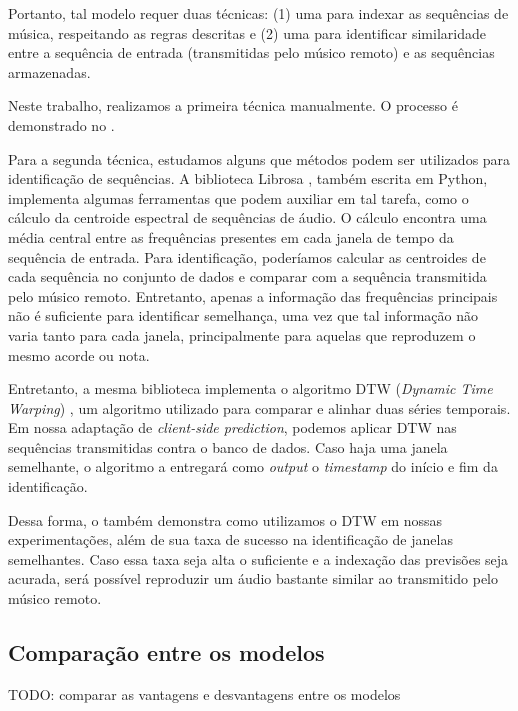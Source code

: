 Portanto, tal modelo requer duas técnicas: (1) uma para indexar as sequências de música, respeitando as regras descritas e (2) uma para identificar similaridade entre a sequência de entrada (transmitidas pelo músico remoto) e as sequências armazenadas.

Neste trabalho, realizamos a primeira técnica manualmente. O processo é demonstrado no .

Para a segunda técnica, estudamos alguns que métodos podem ser utilizados para identificação de sequências. A biblioteca Librosa \cite{librosa}, também escrita em Python, implementa algumas ferramentas que podem auxiliar em tal tarefa, como o cálculo da centroide espectral \cite{centroid} de sequências de áudio. O cálculo encontra uma média central entre as frequências presentes em cada janela de tempo da sequência de entrada. Para identificação, poderíamos calcular as centroides de cada sequência no conjunto de dados e comparar com a sequência transmitida pelo músico remoto. Entretanto, apenas a informação das frequências principais não é suficiente para identificar semelhança, uma vez que tal informação não varia tanto para cada janela, principalmente para aquelas que reproduzem o mesmo acorde ou nota.

Entretanto, a mesma biblioteca implementa o algoritmo DTW (\textit{Dynamic Time Warping}) \cite{dtw}, um algoritmo utilizado para comparar e alinhar duas séries temporais. Em nossa adaptação de \textit{client-side prediction}, podemos aplicar DTW nas sequências transmitidas contra o banco de dados. Caso haja uma janela semelhante, o algoritmo a entregará como \textit{output} o \textit{timestamp} do início e fim da identificação.

Dessa forma, o  também demonstra como utilizamos o DTW em nossas experimentações, além de sua taxa de sucesso na identificação de janelas semelhantes. Caso essa taxa seja alta o suficiente e a indexação das previsões seja acurada, será possível reproduzir um áudio bastante similar ao transmitido pelo músico remoto.

\subsection{Comparação entre os modelos}

TODO: comparar as vantagens e desvantagens entre os modelos